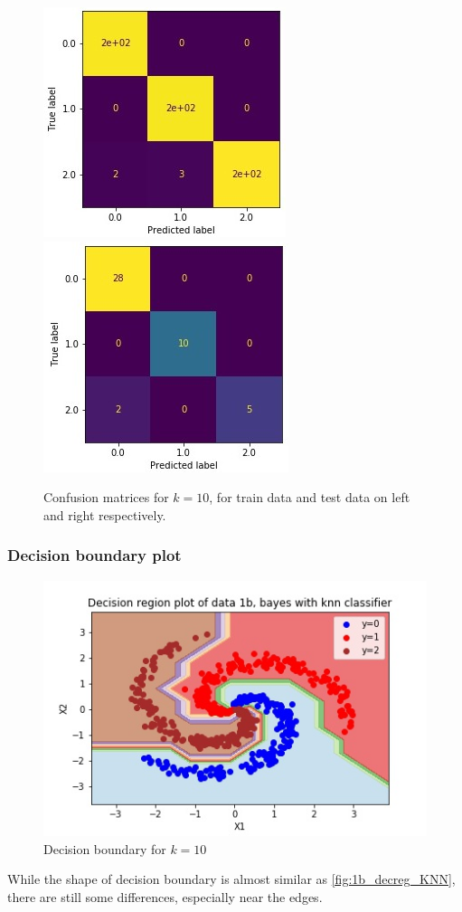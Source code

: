 \documentclass[11pt,a4paper]{article}
\begin{document}
\begin{figure}[H]
    \centering
    \includegraphics[scale=0.7]{images/1b_cm_nb_train.jpg}
    \includegraphics[scale=0.7]{images/1b_cm_nb_test.jpg}
    \caption{Confusion matrices for $k=10$, for train data and test data on left and right respectively.}
    \label{fig:1b_cm_nb}
\end{figure}

\subsubsection{Decision boundary plot}
\begin{figure}[H]
    \centering
    \includegraphics[scale=0.8]{images/1b_nb_decision_region.jpg}
    \caption{Decision boundary for $k=10$}
    \label{fig:1b_decreg_nb}
\end{figure}
While the shape of decision boundary is almost similar as \autoref{fig:1b_decreg_KNN}, there are still some differences, especially near the edges.
\end{document}
